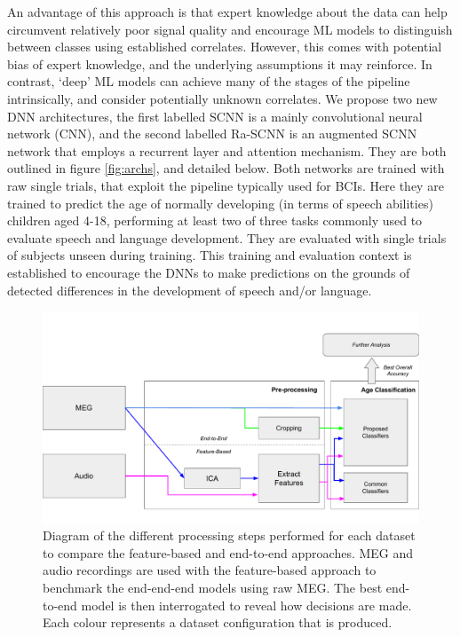 \documentclass[fleqn,10pt]{wlscirep}
\begin{document}
An advantage of this approach is that expert knowledge about the data can help circumvent relatively poor signal quality and encourage ML models to distinguish between classes using established correlates. However, this comes with potential bias of expert knowledge, and the underlying assumptions it may reinforce. In contrast, `deep' ML models can achieve many of the stages of the pipeline intrinsically, and consider potentially unknown correlates. We propose two new DNN architectures, the first labelled SCNN is a mainly convolutional neural network (CNN), and the second labelled Ra-SCNN is an augmented SCNN network that employs a recurrent layer and attention mechanism. They are both outlined in figure \ref{fig:archs}, and detailed below. Both networks are trained with raw single trials, that exploit the pipeline typically used for BCIs. Here they are trained to predict the age of normally developing (in terms of speech abilities) children aged 4-18, performing at least two of three tasks commonly used to evaluate speech and language development. They are evaluated with single trials of subjects unseen during training. This training and evaluation context is established to encourage the DNNs to make predictions on the grounds of detected differences in the development of speech and/or language.

\begin{figure}[ht]
  \centering\includegraphics[width=0.5\linewidth]{pipeline.pdf}
   \caption{Diagram of the different processing steps performed for each dataset to compare the feature-based and end-to-end approaches. MEG and audio recordings are used with the feature-based approach to benchmark the end-end-end models using raw MEG. The best end-to-end model is then interrogated to reveal how decisions are made. Each colour represents a dataset configuration that is produced.}
 \label{fig:proc_stages}
\end{figure}
\end{document}
